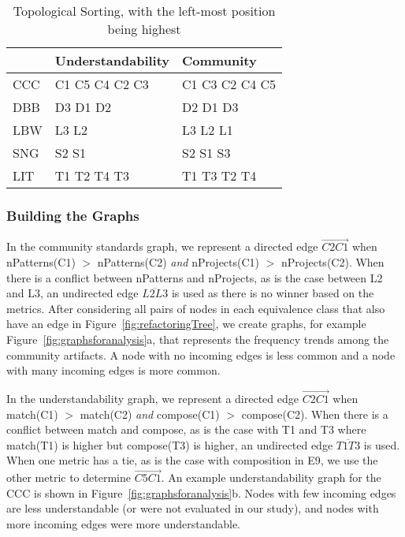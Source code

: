 \begin{table}
\centering
\caption{Topological Sorting, with the left-most position being highest \label{topologicalResults}}
\vspace{-6pt}
\begin{tabular}{| l | l | l |}  \hline
& Understandability & Community  \\ \hline 
CCC & C1 C5 C4 C2 C3  &   C1 C3 C2 C4 C5  \\
DBB & D3 D1 D2  &   D2 D1 D3\\
 LBW & L3 L2	 &  L3 L2 L1 	\\
 SNG &  S2 S1 &  S2 S1 S3 \\
 LIT & T1 T2 T4 T3 & T1 T3 T2 T4 \\
\hline
\end{tabular}
\end{table}


\subsubsection{Building the Graphs}
In the community standards graph, we represent a directed edge  $\overrightarrow{C2  C1}$ when  nPatterns(C1) $>$ nPatterns(C2) \emph{and}  nProjects(C1) $>$ nProjects(C2).
When there is a conflict between nPatterns and nProjects, as is the case between L2 and L3, 
an undirected edge $\overline{L2L3}$ is used as there is no winner based on the  metrics. 
After considering all pairs of nodes in each equivalence class that also have an edge in Figure~\ref{fig:refactoringTree}, we create graphs, for example Figure~\ref{fig:graphsforanalysis}a, that represents the frequency trends among the community artifacts. A node with no incoming edges is less common and a node with many incoming edges is more common. 

In the understandability graph, we represent a directed edge  $\overrightarrow{C2C1}$ when match(C1) $>$ match(C2) \emph{and} compose(C1) $>$ compose(C2). When there is a conflict between match and compose, as is the case with T1 and T3 where match(T1) is higher but compose(T3) is higher, an undirected edge $\overline{T1T3}$ is used. When one metric has a tie, as is the case with composition in E9, we use the other metric to determine  $\overrightarrow{C5C1}$. An example understandability graph for the CCC is shown in Figure~\ref{fig:graphsforanalysis}b. Nodes with few incoming edges are less understandable (or were not evaluated in our study), and nodes with more incoming edges were more understandable. 

